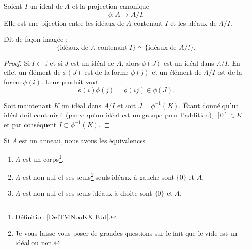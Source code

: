 \begin{proposition}     \label{PropIJJIdsousphi}
    Soient \( I\) un idéal de \( A\) et la projection canonique
    \begin{equation}
        \phi\colon A\to A/I.
    \end{equation}
    Elle est une bijection entre les idéaux de \( A\) contenant \( I\) et les idéaux de \( A/I\).

    Dit de façon imagée :
    \begin{equation}        \label{EqKbrizu}
        \{ \text{idéaux de } A\text{ contenant } I\}\simeq\{ \text{idéaux de } A/I \}.
    \end{equation}
\end{proposition}

\begin{proof}
    Si \( I\subset J\) et si \( J \) est un idéal de \( A\), alors \( \phi(J)\) est un idéal dans \( A/I\). En effet un élément de \( \phi(J)\) est de la forme \( \phi(j)\) et un élément de \( A/I\) est de la forme \( \phi(i)\). Leur produit vaut
    \begin{equation}
        \phi(i)\phi(j)=\phi(ij)\in\phi(J).
    \end{equation}

    Soit maintenant \( K\) un idéal dans \( A/I\) et soit \( J=\phi^{-1}(K)\). Étant donné qu'un idéal doit contenir \( 0\) (parce qu'un idéal est un groupe pour l'addition), \( [0]\in K\) et par conséquent \( I\subset\phi^{-1}(K)\).
\end{proof}

\begin{proposition}     \label{AnnCorpsIdeal}\label{PROPooUOCVooZGAVVk}
    Si \( A\) est un anneau, nous avons les équivalences
    \begin{enumerate}
        \item       \label{ITEMooLAAVooXhTcMe}
            \( A\) est un corps\footnote{Définition \ref{DefTMNooKXHUd}.}.
        \item       \label{ITEMooDGZIooRopYGx}
            \( A\) est non nul et ses seuls\footnote{Je vous laisse vous poser de grandes questions sur le fait que le vide est un idéal ou non.} seuls idéaux à gauche sont \( \{ 0 \}\) et \( A\).
        \item       \label{ITEMooLPWHooDJpTbR}
            \( A\) est non nul et ses seuls idéaux à droite sont \( \{ 0 \}\) et \( A\).
    \end{enumerate}
\end{proposition}

